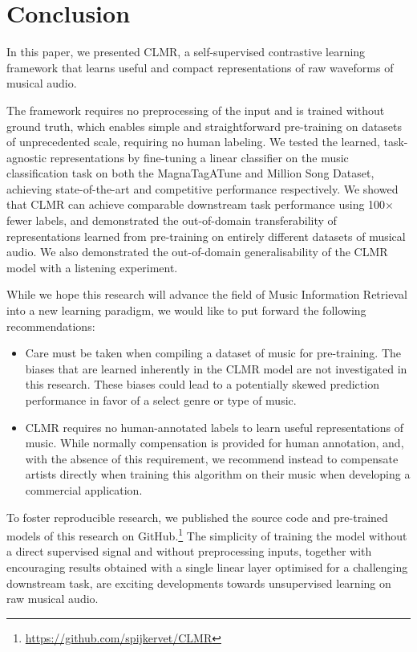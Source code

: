 \chapter{Conclusion}\label{sec:conclusion}
In this paper, we presented CLMR, a self-supervised contrastive learning framework that learns useful and compact representations of raw waveforms of musical audio.

The framework requires no preprocessing of the input and is trained without ground truth, which enables simple and straightforward pre-training on datasets of unprecedented scale, requiring no human labeling. We tested the learned, task-agnostic representations by fine-tuning a linear classifier on the music classification task on both the MagnaTagATune and Million Song Dataset, achieving state-of-the-art and competitive performance respectively. We showed that CLMR can achieve comparable downstream task performance using 100$\times$ fewer labels, and demonstrated the out-of-domain transferability of representations learned from pre-training on entirely different datasets of musical audio. We also demonstrated the out-of-domain generalisability of the CLMR model with a listening experiment.

While we hope this research will advance the field of Music Information Retrieval into a new learning paradigm, we would like to put forward the following recommendations:

\begin{itemize}
    \item Care must be taken when compiling a dataset of music for pre-training. The biases that are learned inherently in the CLMR model are not investigated in this research. These biases could lead to a potentially skewed prediction performance in favor of a select genre or type of music.
    \item CLMR requires no human-annotated labels to learn useful representations of music. While normally compensation is provided for human annotation, and, with the absence of this requirement, we recommend instead to compensate artists directly when training this algorithm on their music when developing a commercial application.
\end{itemize}

To foster reproducible research, we published the source code and pre-trained models of this research on GitHub.\footnote{\url{https://github.com/spijkervet/CLMR}}
The simplicity of training the model without a direct supervised signal and without preprocessing inputs, together with encouraging results obtained with a single linear layer optimised for a challenging downstream task, are exciting developments towards unsupervised learning on raw musical audio.